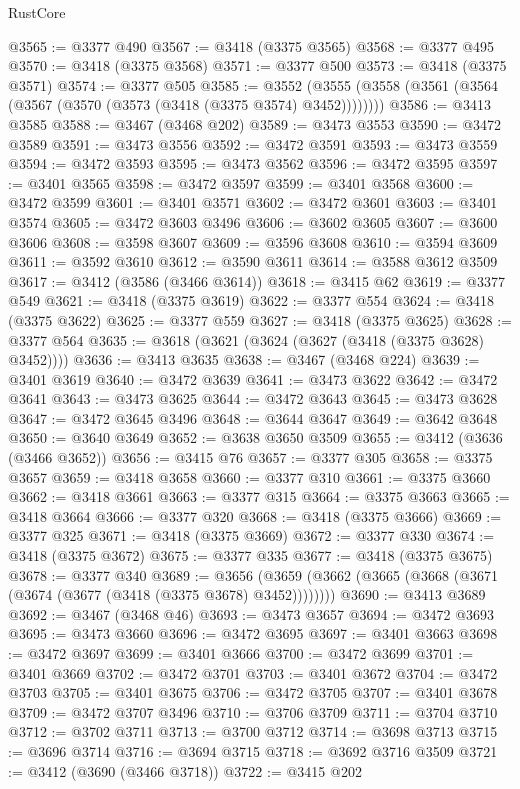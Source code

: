 \begin{lexlean}{RustCore}
\begin{coremodule}
@3565 := @3377 @490
@3567 := @3418 (@3375 @3565)
@3568 := @3377 @495
@3570 := @3418 (@3375 @3568)
@3571 := @3377 @500
@3573 := @3418 (@3375 @3571)
@3574 := @3377 @505
@3585 := @3552 (@3555 (@3558 (@3561 (@3564 (@3567 (@3570 (@3573 (@3418 (@3375 @3574) @3452))))))))
@3586 := @3413 @3585
@3588 := @3467 (@3468 @202)
@3589 := @3473 @3553
@3590 := @3472 @3589
@3591 := @3473 @3556
@3592 := @3472 @3591
@3593 := @3473 @3559
@3594 := @3472 @3593
@3595 := @3473 @3562
@3596 := @3472 @3595
@3597 := @3401 @3565
@3598 := @3472 @3597
@3599 := @3401 @3568
@3600 := @3472 @3599
@3601 := @3401 @3571
@3602 := @3472 @3601
@3603 := @3401 @3574
@3605 := @3472 @3603 @3496
@3606 := @3602 @3605
@3607 := @3600 @3606
@3608 := @3598 @3607
@3609 := @3596 @3608
@3610 := @3594 @3609
@3611 := @3592 @3610
@3612 := @3590 @3611
@3614 := @3588 @3612 @3509
@3617 := @3412 (@3586 (@3466 @3614))
@3618 := @3415 @62
@3619 := @3377 @549
@3621 := @3418 (@3375 @3619)
@3622 := @3377 @554
@3624 := @3418 (@3375 @3622)
@3625 := @3377 @559
@3627 := @3418 (@3375 @3625)
@3628 := @3377 @564
@3635 := @3618 (@3621 (@3624 (@3627 (@3418 (@3375 @3628) @3452))))
@3636 := @3413 @3635
@3638 := @3467 (@3468 @224)
@3639 := @3401 @3619
@3640 := @3472 @3639
@3641 := @3473 @3622
@3642 := @3472 @3641
@3643 := @3473 @3625
@3644 := @3472 @3643
@3645 := @3473 @3628
@3647 := @3472 @3645 @3496
@3648 := @3644 @3647
@3649 := @3642 @3648
@3650 := @3640 @3649
@3652 := @3638 @3650 @3509
@3655 := @3412 (@3636 (@3466 @3652))
@3656 := @3415 @76
@3657 := @3377 @305
@3658 := @3375 @3657
@3659 := @3418 @3658
@3660 := @3377 @310
@3661 := @3375 @3660
@3662 := @3418 @3661
@3663 := @3377 @315
@3664 := @3375 @3663
@3665 := @3418 @3664
@3666 := @3377 @320
@3668 := @3418 (@3375 @3666)
@3669 := @3377 @325
@3671 := @3418 (@3375 @3669)
@3672 := @3377 @330
@3674 := @3418 (@3375 @3672)
@3675 := @3377 @335
@3677 := @3418 (@3375 @3675)
@3678 := @3377 @340
@3689 := @3656 (@3659 (@3662 (@3665 (@3668 (@3671 (@3674 (@3677 (@3418 (@3375 @3678) @3452))))))))
@3690 := @3413 @3689
@3692 := @3467 (@3468 @46)
@3693 := @3473 @3657
@3694 := @3472 @3693
@3695 := @3473 @3660
@3696 := @3472 @3695
@3697 := @3401 @3663
@3698 := @3472 @3697
@3699 := @3401 @3666
@3700 := @3472 @3699
@3701 := @3401 @3669
@3702 := @3472 @3701
@3703 := @3401 @3672
@3704 := @3472 @3703
@3705 := @3401 @3675
@3706 := @3472 @3705
@3707 := @3401 @3678
@3709 := @3472 @3707 @3496
@3710 := @3706 @3709
@3711 := @3704 @3710
@3712 := @3702 @3711
@3713 := @3700 @3712
@3714 := @3698 @3713
@3715 := @3696 @3714
@3716 := @3694 @3715
@3718 := @3692 @3716 @3509
@3721 := @3412 (@3690 (@3466 @3718))
@3722 := @3415 @202

\end{coremodule}
\end{lexlean}
